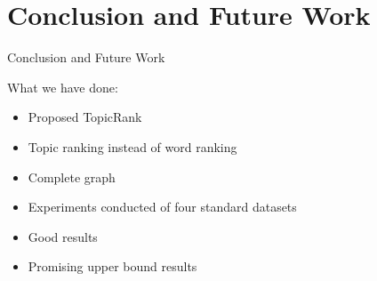 \section{Conclusion and Future Work}
  \begin{frame}{Conclusion and Future Work}

    What we have done:
    \begin{itemize}
      \item{Proposed TopicRank}
      \item{Topic ranking instead of word ranking}
      \item{Complete graph}
      \item{Experiments conducted of four standard datasets}
      \item{Good results}
      \item{Promising upper bound results}
    \end{itemize}

    \vfill

  \end{frame}

